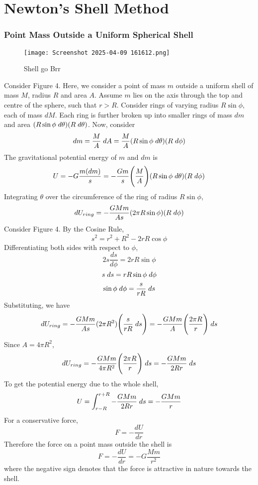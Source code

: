 \documentclass{article}
\begin{document}
\section{Newton's Shell Method}
\subsubsection{Point Mass Outside a Uniform Spherical Shell}
\begin{figure}
    \centering
    \texttt{[image: Screenshot 2025-04-09 161612.png]}
    \caption{Shell go Brr}
    \label{Fig:4}
\end{figure}
Consider Figure 4. Here, we consider a point of mass $m$ outside a uniform shell of mass $M$, radius $R$ and area $A$. Assume $m$ lies on the axis through the top and centre of the sphere, such that $r>R$. Consider rings of varying radius $R\sin{\phi}$, each of mass $dM$. Each ring is further broken up into smaller rings of mass $dm$ and area $(R\sin{\phi}\hspace{0.1cm}d\theta)(R\hspace{0.1cm}d\theta)$. Now, consider 
$$dm=\frac{M}{A}\hspace{0.1cm}dA=\frac{M}{A}(R\sin{\phi}\hspace{0.1cm}d\theta)(R\hspace{0.1cm}d\phi)$$
The gravitational potential energy of $m$ and $dm$ is 
$$U=-G\frac{m(dm)}{s}=-\frac{Gm}{s}\Bigg(\frac{M}{A}\Bigg)(R\sin{\phi}\hspace{0.1cm}d\theta)(R\hspace{0.1cm}d\phi)$$
Integrating $\theta$ over the circumference of the ring of radius $R\sin{\phi}$,
$$dU_{ring}=-\frac{GMm}{As}(2\pi R\sin{\phi})(R\hspace{0.1cm}d\phi)$$
Consider Figure 4. By the Cosine Rule, 
$$s^2=r^2+R^2-2rR\cos{\phi}$$
Differentiating both sides with respect to $\phi$,
$$2s\frac{ds}{d\phi}=2rR\sin{\phi}$$
$$s\hspace{0.1cm}ds=rR\sin{\phi}\hspace{0.1cm}d\phi$$
$$\sin{\phi}\hspace{0.1cm}d\phi=\frac{s}{rR}\hspace{0.1cm}ds$$
Substituting, we have
$$dU_{ring}=-\frac{GMm}{As}(2\pi R^2)\Bigg(\frac{s}{rR}\hspace{0.1cm}ds\Bigg)=-\frac{GMm}{A}\Bigg(\frac{2\pi R}{r}\Bigg)\hspace{0.1cm}ds$$
Since $A=4\pi R^2$,
$$dU_{ring}=-\frac{GMm}{4\pi R^2}\Bigg(\frac{2\pi R}{r}\Bigg)\hspace{0.1cm}ds=-\frac{GMm}{2Rr}\hspace{0.1cm}ds$$
To get the potential energy due to the whole shell,
$$U=\int_{r-R}^{r+R}-\frac{GMm}{2Rr}\hspace{0.1cm}ds=-\frac{GMm}{r}$$
For a conservative force, 
$$F=-\frac{dU}{dr}$$
Therefore the force on a point mass outside the shell is 
$$F=-\frac{dU}{dr}=-G\frac{Mm}{r^2}$$
where the negative sign denotes that the force is attractive in nature towards the shell.
\end{document}
